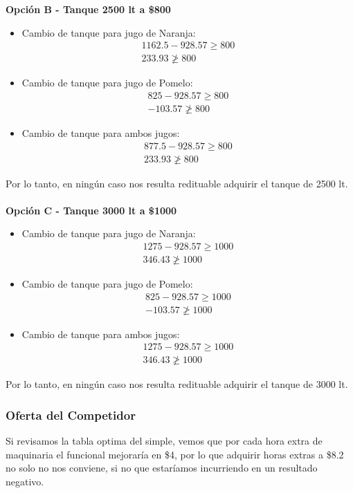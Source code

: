 \begin{homeworkProblem}[-1][Citrus]
\textbf{Opción B - Tanque 2500 lt a \$800} \\
\begin{itemize}
  \item Cambio de tanque para jugo de Naranja:
  \begin{align*}
    1162.5 - 928.57 \ge 800 \\
    233.93 \ngeq 800 
  \end{align*}
  \item Cambio de tanque para jugo de Pomelo:
  \begin{align*}
    825 - 928.57 \ge 800 \\
    - 103.57 \ngeq 800 
  \end{align*}
  \item Cambio de tanque para ambos jugos:
  \begin{align*}
    877.5 - 928.57 \ge 800 \\
    233.93 \ngeq 800 
  \end{align*}
\end{itemize}
Por lo tanto, en ningún caso nos resulta redituable adquirir el tanque de 2500 lt.\\ \\ 
\textbf{Opción C - Tanque 3000 lt a \$1000} \\
\begin{itemize}
  \item Cambio de tanque para jugo de Naranja:
  \begin{align*}
    1275 - 928.57 \ge 1000 \\
    346.43 \ngeq 1000 
  \end{align*}
  \item Cambio de tanque para jugo de Pomelo:
  \begin{align*}
    825 - 928.57 \ge 1000 \\
    - 103.57 \ngeq 1000 
  \end{align*}
  \item Cambio de tanque para ambos jugos:
  \begin{align*}
    1275 - 928.57 \ge 1000 \\
    346.43 \ngeq 1000 
  \end{align*}
\end{itemize}
Por lo tanto, en ningún caso nos resulta redituable adquirir el tanque de 3000 lt.
\subsubsection{Oferta del Competidor}
Si revisamos la tabla optima del simple, vemos que por cada hora extra de maquinaria el funcional mejoraría en \$4, por lo que adquirir horas extras a \$8.2 no solo no nos conviene, si no que estaríamos incurriendo en un resultado negativo.
\end{homeworkProblem}
